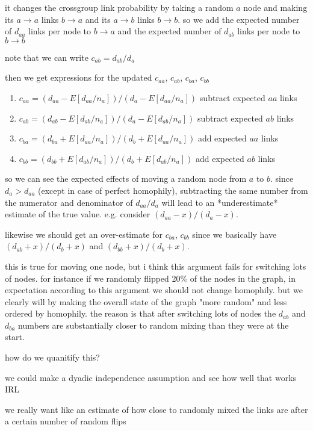\documentclass[a4paper]{article}
\begin{document}
it changes the crossgroup link probability by taking a random $a$ node and making its $a\to a$ links $b\to a$ and its $a\to b$ links $b\to b$. so we add the expected number of $d_{aa}$ links per node to $b\to a$ and the expected number of $d_{ab}$ links per node to $b\to b$

note that we can write $c_{ab} = d_{ab} / d_a$

then we get expressions for the updated $c_{aa}$, $c_{ab}$, $c_{ba}$, $c_{bb}$

\begin{enumerate}
\item $c_{aa} = (d_{aa} - E[d_{aa}/n_a]) / (d_a - E[d_{aa}/n_a])$ subtract expected $aa$ links
\item $c_{ab} = (d_{ab} - E[d_{ab}/n_a]) / (d_a - E[d_{ab}/n_a])$ subtract expected $ab$ links
\item $c_{ba} = (d_{ba} + E[d_{aa}/n_a]) / (d_b + E[d_{aa}/n_a])$ add expected $aa$ links
\item $c_{bb} = (d_{bb} + E[d_{ab}/n_a]) / (d_b + E[d_{ab}/n_a])$ add expected $ab$ links
\end{enumerate}


so we can see the expected effects of moving a random node from $a$ to $b$. since $d_a > d_{aa}$ (except in case of perfect homophily), subtracting the same number from the numerator and denominator of $d_{aa} / d_a$ will lead to an *underestimate* estimate of the true value. e.g. consider $(d_{aa} - x) / (d_a - x)$.

likewise we should get an over-estimate for $c_{ba}$, $c_{bb}$ since we basically have $(d_{ab} + x) / (d_b + x)$ and $(d_{bb} + x) / (d_b + x)$.

this is true for moving one node, but i think this argument fails for switching lots of nodes. for instance if we randomly flipped 20\% of the nodes in the graph, in expectation according to this argument we should not change homophily. but we clearly will by making the overall state of the graph "more random" and less ordered by homophily. the reason is that after switching lots of nodes the $d_{ab}$ and $d_{ba}$ numbers are substantially closer to random mixing than they were at the start.

how do we quanitify this?

we could make a dyadic independence assumption and see how well that works IRL

we really want like an estimate of how close to randomly mixed the links are after a certain number of random flips
\end{document}
